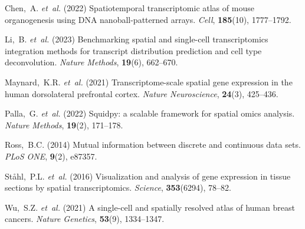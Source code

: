 \documentclass[]{bioinfo}
\begin{document}
\begin{thebibliography}{}

Chen,~A. \textit{et~al.} (2022)
Spatiotemporal transcriptomic atlas of mouse organogenesis using DNA
nanoball-patterned arrays.
\textit{Cell}, \textbf{185}(10), 1777--1792.

Li,~B. \textit{et~al.} (2023)
Benchmarking spatial and single-cell transcriptomics integration methods
for transcript distribution prediction and cell type deconvolution.
\textit{Nature Methods}, \textbf{19}(6), 662--670.

Maynard,~K.R. \textit{et~al.} (2021)
Transcriptome-scale spatial gene expression in the human dorsolateral
prefrontal cortex.
\textit{Nature Neuroscience}, \textbf{24}(3), 425--436.

Palla,~G. \textit{et~al.} (2022)
Squidpy: a scalable framework for spatial omics analysis.
\textit{Nature Methods}, \textbf{19}(2), 171--178.

Ross,~B.C. (2014)
Mutual information between discrete and continuous data sets.
\textit{PLoS ONE}, \textbf{9}(2), e87357.

St{\aa}hl,~P.L. \textit{et~al.} (2016)
Visualization and analysis of gene expression in tissue sections by
spatial transcriptomics.
\textit{Science}, \textbf{353}(6294), 78--82.

Wu,~S.Z. \textit{et~al.} (2021)
A single-cell and spatially resolved atlas of human breast cancers.
\textit{Nature Genetics}, \textbf{53}(9), 1334--1347.

\end{thebibliography}
\end{document}
